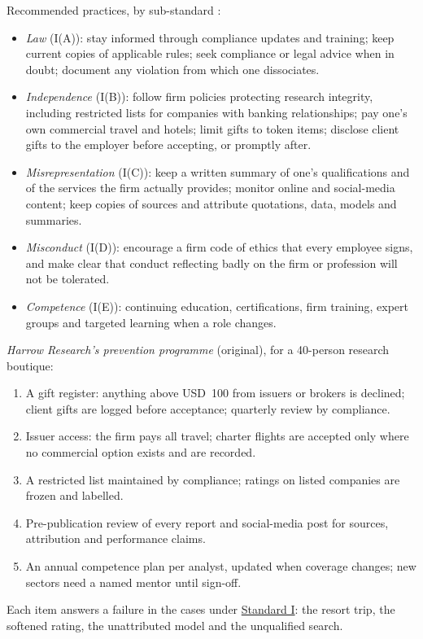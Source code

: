 \begin{qfmethod}\label{meth:preventing-professionalism-violations}
 Recommended practices, by sub-standard \citep[pp.~6, 14--15, 25--26, 37, 43]{standards-practice-handbook-2024}:
\begin{itemize}
\item \emph{Law} (I(A)): stay informed through compliance updates and training; keep current copies of applicable rules; seek compliance or legal advice when in doubt; document any violation from which one dissociates.
\item \emph{Independence} (I(B)): follow firm policies protecting research integrity, including restricted lists for companies with banking relationships; pay one's own commercial travel and hotels; limit gifts to token items; disclose client gifts to the employer before accepting, or promptly after.
\item \emph{Misrepresentation} (I(C)): keep a written summary of one's qualifications and of the services the firm actually provides; monitor online and social-media content; keep copies of sources and attribute quotations, data, models and summaries.
\item \emph{Misconduct} (I(D)): encourage a firm code of ethics that every employee signs, and make clear that conduct reflecting badly on the firm or profession will not be tolerated.
\item \emph{Competence} (I(E)): continuing education, certifications, firm training, expert groups and targeted learning when a role changes.
\end{itemize}

 \emph{Harrow Research's prevention programme} (original), for a 40-person research boutique:
\begin{enumerate}
\item A gift register: anything above USD~100 from issuers or brokers is declined; client gifts are logged before acceptance; quarterly review by compliance.
\item Issuer access: the firm pays all travel; charter flights are accepted only where no commercial option exists and are recorded.
\item A restricted list maintained by compliance; ratings on listed companies are frozen and labelled.
\item Pre-publication review of every report and social-media post for sources, attribution and performance claims.
\item An annual competence plan per analyst, updated when coverage changes; new sectors need a named mentor until sign-off.
\end{enumerate}
Each item answers a failure in the cases under \hyperref[rule:standard-professionalism]{Standard I}: the resort trip, the softened rating, the unattributed model and the unqualified search.


\end{qfmethod}
